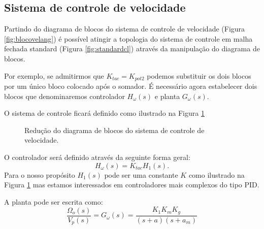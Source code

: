 \documentclass[10pt]{article}
\theoremstyle{plain}
\begin{document}
\subsection{Sistema de controle de velocidade}

Partindo do diagrama de blocos do sistema de controle de velocidade (Figura \ref{fig:blocovelang}) é possível atingir a topologia do sistema de controle em malha fechada standard
(Figura \ref{fig:standardcl}) através da manipulação do diagrama de blocos.

Por exemplo, se admitirmos que $K_{tac}=K_{pot2}$ podemos substituir os dois blocos por um único
bloco colocado após o somador.
É necessário agora estabelecer dois blocos que denominaremos controlador $H_\omega(s)$ e planta $G_\omega(s)$.

O sistema de controle ficará definido como ilustrado na Figura \ref{fig:rearranjovel}

\begin{figure}[H]\centering

\caption{Redução do diagrama de blocos do sistema de controle de velocidade.}
\label{fig:rearranjovel}
\end{figure}

O controlador será definido através da seguinte forma geral:
\begin{equation}
H_\omega(s)=K_{tac}H_1(s).
\end{equation}
Para o nosso propósito $H_1(s)$ pode ser uma constante $K$ como ilustrado na Figura \ref{fig:rearranjovel} mas estamos interessados em controladores mais
complexos do tipo PID.

A planta pode ser escrita como:
\begin{equation}
\frac{\Omega_o(s)}{V_p(s)}=G_\omega(s)=\frac{K_1 K_m K_g}{(s+a)(s+a_m)}
\end{equation}



\end{document}
